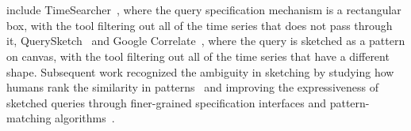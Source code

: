   \section{}
  \par {} include TimeSearcher~\cite{Hochheiser2001,Hochheiser2004}, where the query specification mechanism is a rectangular box, with the tool filtering out all of the time series that does not pass through it, QuerySketch~\cite{wattenberg2001sketching} and Google Correlate~\cite{mohebbi2011google}, where the query is sketched as a pattern on canvas, with the tool filtering out all of the time series that have a different shape. Subsequent work recognized the ambiguity in sketching by studying how humans rank the similarity in patterns~\cite{Eichmann2015,correll2016semantics,Mannino2018} and improving the expressiveness of sketched queries through finer-grained specification interfaces and pattern-matching algorithms~\cite{ryall2005querylines,Holz2009}.
